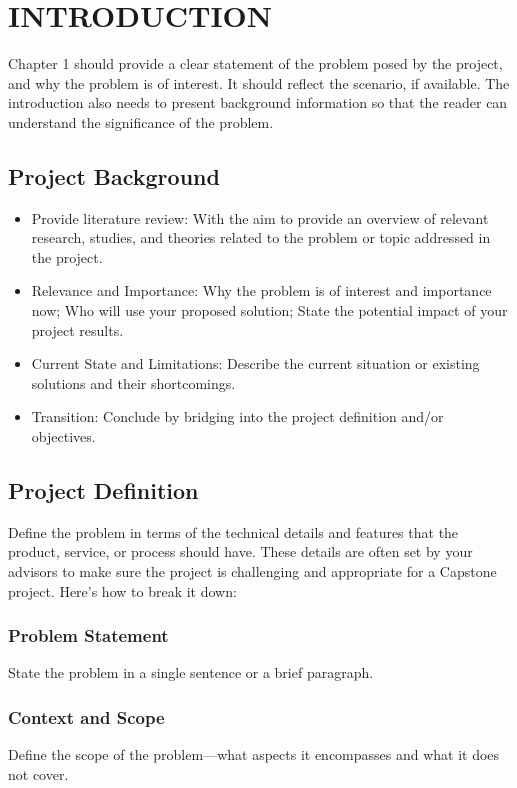 \chapter{INTRODUCTION}

Chapter 1 should provide a clear statement of the problem posed by the project, and
why the problem is of interest. It should reflect the scenario, if available. The
introduction also needs to present background information so that the reader can
understand the significance of the problem.


\section{Project Background }

\begin{itemize}
\item Provide literature review: With the aim to provide an overview of relevant research, studies, and theories related to the problem or topic addressed in the project.

\item Relevance and Importance: Why the problem is of interest and importance now; Who will use your proposed solution; State the potential impact of your project results.

\item Current State and Limitations: Describe the current situation or existing solutions and their shortcomings.

\item Transition: Conclude by bridging into the project definition and/or objectives.
\end{itemize}

\section{Project Definition}
Define the problem in terms of the technical details and features that the product, service, or process should have. These details are often set by your advisors to make sure the project is challenging and appropriate for a Capstone project. Here's how to break it down:


\subsection{Problem Statement} 
State the problem in a single sentence or a brief paragraph.


\subsection{Context and Scope}
Define the scope of the problem—what aspects it
encompasses and what it does not cover.


